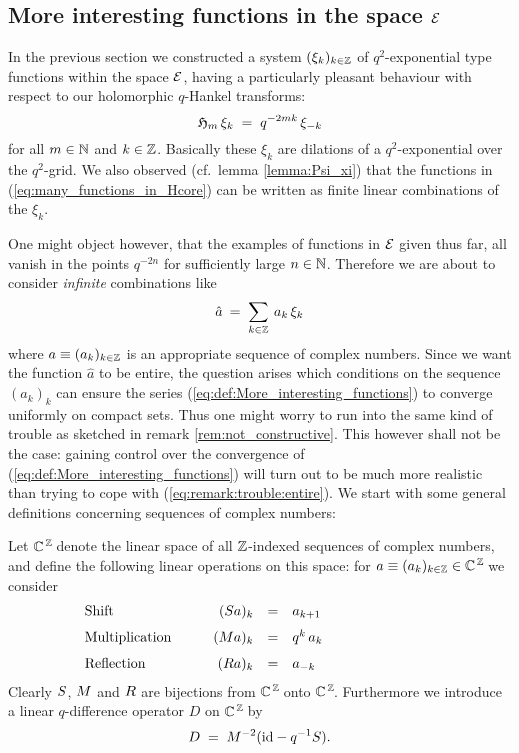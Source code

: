 
\subsection{More interesting functions in the space $\mathcal E$}


In the previous section we constructed a system $(\xi_k)_{k\in \mathbb{Z}}$ of
$q^2$-exponential type functions within the space $\mathcal E$, having a particularly
pleasant behaviour with respect to our holomorphic $q$-Hankel transforms:
\begin{equation}\label{eq:xi_k_under_Hol_hankel}
\mathfrak{H}_{m}\, \xi_k \;=\; q^{-2mk} \,  \xi_{-k}
\end{equation}
for all $m\in \mathbb{N}$ and $k\in \mathbb{Z}$.
Basically these $\xi_k$ are dilations of a $q^2$-exponential
over the $q^2$-grid. We also observed (cf.\ lemma \ref{lemma:Psi_xi}) that the
functions in (\ref{eq:many_functions_in_Hcore}) can be written as
finite linear combinations of the $\xi_k$.

One might object however, that the examples of functions in $\mathcal E$ given
thus far, all vanish in the points $q^{-2n}$ for sufficiently large $n \in \mathbb{N}$.
Therefore we are about to consider {\em infinite\/} combinations like
\begin{equation} \label{eq:def:More_interesting_functions}
   \hat{a} \:=\; \sum_{k \in \mathbb{Z}} \: a_k \,\xi_k
\end{equation}
where $a \equiv (a_k)_{k\in\mathbb{Z}}$ is an appropriate sequence of complex numbers.
Since we want the function $\hat{a}$ to be entire, the question arises which
conditions on the sequence $(a_k)_k$ can ensure the series
(\ref{eq:def:More_interesting_functions}) to converge uniformly on compact sets.
Thus one might worry to run into the same kind of trouble as sketched in
remark \ref{rem:not_constructive}\@.
This however shall not be the case: gaining control over the convergence of
(\ref{eq:def:More_interesting_functions}) will turn out to be much more
realistic than trying to cope with (\ref{eq:remark:trouble:entire}).
We start with some general definitions concerning sequences of complex numbers:


\begin{defn*} \label{def:sequence_operations}
Let $\mathbb{C}^{\, \mathbb{Z}\!}$ denote the linear space of all $\mathbb{Z}$-indexed sequences
of complex numbers, and define the following linear operations on this space:
for $a \equiv (a_k)_{k\in\mathbb{Z}} \in \mathbb{C}^{\, \mathbb{Z}\!}$ we consider
$$\begin{array}{lcrcl}
\mbox{Shift}            &\hspace{1em}&   (\seqS a)_k  &=&  a_{k+1}
\\ \vertXL
\mbox{Multiplication}   &&    (\seqM a)_k   &=&  q^k \,a_k
\\ \vertXL
\mbox{Reflection}       &&    (\seqR a)_k   &=&  a_{-k}
\end{array}\hspace{8em}$$
Clearly $S$, $M$ and $R$ are bijections from $\mathbb{C}^{\, \mathbb{Z}\!}$ onto $\mathbb{C}^{\, \mathbb{Z}\!}$.
Furthermore we introduce a linear $q$-difference operator $D$ on $\mathbb{C}^{\, \mathbb{Z}\!}$ by
$$ D  \;=\;  M^{-2} (\mbox{\rm id} - q^{-1} S). $$
\end{defn*}



